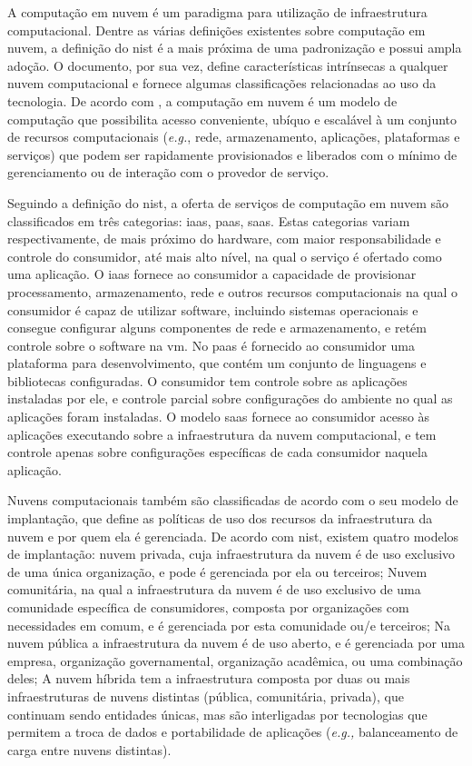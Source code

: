 A computação em nuvem é um paradigma para utilização de infraestrutura computacional.
%
Dentre as várias definições existentes sobre computação em nuvem, a definição do \ac{nist} \cite{nistcloudcomputing} é a mais próxima de uma padronização e possui ampla adoção.
%
O documento, por sua vez, define características intrínsecas a qualquer nuvem computacional e fornece algumas classificações relacionadas ao uso da tecnologia.
%
De acordo com , a computação em nuvem é um modelo de computação que possibilita acesso conveniente, ubíquo e escalável à um conjunto de recursos computacionais (\textit{e.g.}, rede, armazenamento, aplicações, plataformas e serviços) que podem ser rapidamente provisionados e liberados com o mínimo de gerenciamento ou de interação com o provedor de serviço.

Seguindo a definição do \ac{nist}, a oferta de serviços de computação em nuvem são classificados em três categorias: \acf{iaas}, \ac{paas}, \ac{saas}. 
%
Estas categorias variam respectivamente, de mais próximo do hardware, com maior responsabilidade e controle do consumidor, até mais alto nível, na qual o serviço é ofertado como uma aplicação. 
%
O \ac{iaas} fornece ao consumidor a capacidade de provisionar processamento, armazenamento, rede e outros recursos computacionais na qual o consumidor é capaz de utilizar software, incluindo sistemas operacionais e consegue configurar alguns componentes de rede e armazenamento, e retém controle sobre o software na \ac{vm}.
%
No \ac{paas} é fornecido ao consumidor uma plataforma para desenvolvimento, que contém um conjunto de linguagens e bibliotecas configuradas. 
%
O consumidor tem controle sobre as aplicações instaladas por ele, e controle parcial sobre configurações do ambiente no qual as aplicações foram instaladas.
%
O modelo \ac{saas} fornece ao consumidor acesso às aplicações executando sobre a infraestrutura da nuvem computacional, e tem controle apenas sobre configurações específicas de cada consumidor naquela aplicação.

Nuvens computacionais também são classificadas de acordo com o seu modelo de implantação, que define as políticas de uso dos recursos da infraestrutura da nuvem e por quem ela é gerenciada.
%
De acordo com \ac{nist}, existem quatro modelos de implantação:
nuvem privada, cuja infraestrutura da nuvem é de uso exclusivo de uma única organização, e pode é gerenciada por ela ou terceiros;
%
Nuvem comunitária, na qual a infraestrutura da nuvem é de uso exclusivo de uma comunidade específica de consumidores, composta por organizações com necessidades em comum, e é gerenciada por esta comunidade ou/e terceiros;
%
Na nuvem pública a infraestrutura da nuvem é de uso aberto, e é gerenciada por uma empresa, organização governamental, organização acadêmica, ou uma combinação deles;
%
A nuvem híbrida tem a infraestrutura composta por duas ou mais infraestruturas de nuvens distintas (pública, comunitária, privada), que continuam sendo entidades únicas, mas são interligadas por tecnologias que permitem a troca de dados e portabilidade de aplicações (\textit{e.g.,} balanceamento de carga entre nuvens distintas).


